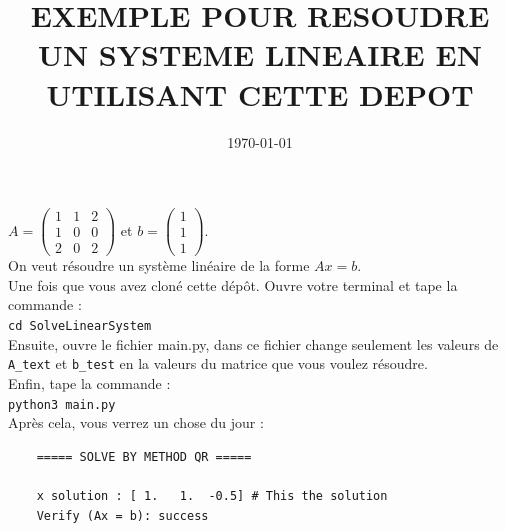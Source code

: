 \documentclass[12pt, a4paper, french]{article}
\date{\today}
\author{}
\title{EXEMPLE POUR RESOUDRE UN SYSTEME LINEAIRE EN UTILISANT CETTE DEPOT}
\begin{document}
\maketitle
$A = \left(\begin{array}{ccc} 1 & 1 & 2 \\ 1 & 0 & 0 \\ 2 & 0 & 2 \end{array} \right)$ et $b = \left(\begin{array}{c} 1 \\ 1 \\ 1\end{array}\right)$.\\
On veut résoudre un système linéaire de la forme $Ax = b$.\\
Une fois que vous avez cloné cette dépôt. Ouvre votre terminal et tape la commande  : \\ \verb|cd SolveLinearSystem| \\
Ensuite, ouvre le fichier main.py, dans ce fichier change seulement les valeurs de \verb|A_text| et \verb|b_test| en la valeurs du matrice que vous voulez résoudre. \\
Enfin, tape la commande : \\
\verb|python3 main.py| \\
Après cela, vous verrez un chose du jour : \\
\begin{verbatim}
    ===== SOLVE BY METHOD QR ===== 

    x solution : [ 1.   1.  -0.5] # This the solution
    Verify (Ax = b): success
\end{verbatim}
\end{document}
